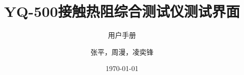 \documentclass[cn,11pt]{MyElegantbook}
\title{YQ-500接触热阻综合测试仪测试界面}
\subtitle{用户手册}
\author{张平，周漫，凌奕锋}
\date{\today}
\begin{document}
\maketitle
\tableofcontents


\mainmatter
\hypersetup{pageanchor=true}











\nocite{*}



\begin{appendices}
    
    
    
    
\end{appendices}
\end{document}
